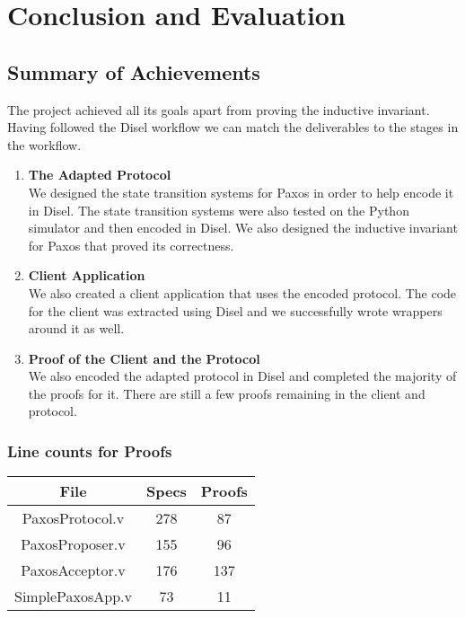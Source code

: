 \chapter{Conclusion and Evaluation}

\section{Summary of Achievements}
The project achieved all its goals apart from proving the inductive invariant.
Having followed the Disel workflow we can match the deliverables to the
stages in the workflow.
\begin{enumerate}
  \item \textbf{The Adapted Protocol} \\
    We designed the state transition systems for Paxos in order to help encode it in
    Disel. The state transition systems were also tested on the Python simulator
    and then encoded in Disel. We also designed the inductive invariant for Paxos
    that proved its correctness.
  \item \textbf{Client Application} \\
    We also created a client application that uses the encoded protocol. The
    code for the client was extracted using Disel and we successfully wrote
    wrappers around it as well.
  \item \textbf{Proof of the Client and the Protocol} \\
    We also encoded the adapted protocol in Disel and completed the majority
    of the proofs for it. There are still a few proofs remaining in the
    client and protocol.
\end{enumerate}

\vspace{-5mm}
\subsection{Line counts for Proofs}
\begin{center}
\begin{tabular}{ |c|c|c| }
\hline
File & Specs & Proofs\\
\hline
PaxosProtocol.v & 278 & 87 \\
PaxosProposer.v & 155 & 96 \\
PaxosAcceptor.v & 176 & 137 \\
SimplePaxosApp.v & 73 & 11 \\
\hline
\end{tabular}
\end{center}

